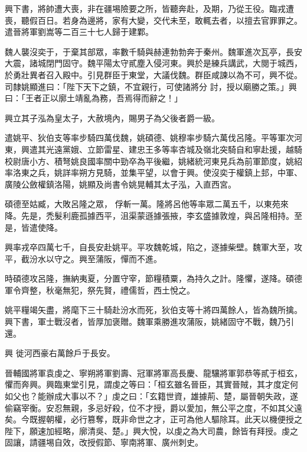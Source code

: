 \begin{pinyinscope}
 興下書，將帥遭大喪，非在疆埸險要之所，皆聽奔赴，及期，乃從王役。臨戎遭喪，聽假百日。若身為邊將，家有大變，交代未至，敢輒去者，以擅去官罪罪之。遣晉將軍劉嵩等二百三十七人歸于建鄴。



 魏人襲沒奕于，于棄其部眾，率數千騎與赫連勃勃奔于秦州。魏軍進次瓦亭，長安大震，諸城閉門固守。魏平陽太守貳塵入侵河東。興於是練兵講武，大閱于城西，於勇壯異者召入殿中。引見群臣于東堂，大議伐魏。群臣咸諫以為不可，興不從。司隸姚顯進曰：「陛下天下之鎮，不宜親行，可使諸將分
 討，授以廟勝之策。」興曰：「王者正以廓土靖亂為務，吾焉得而辭之！」



 興立其子泓為皇太子，大赦境內，賜男子為父後者爵一級。



 遣姚平、狄伯支等率步騎四萬伐魏，姚碩德、姚穆率步騎六萬伐呂隆。平等軍次河東，興遣其光遠黨娥、立節雷星、建忠王多等率杏城及嶺北突騎自和寧赴援，越騎校尉唐小方、積弩姚良國率關中勁卒為平後繼，姚緒統河東見兵為前軍節度，姚紹率洛東之兵，姚詳率朔方見騎，並集平望，以會于興。使沒奕于權鎮上邽，中軍、廣陵公斂權鎮洛陽，姚顯及尚書令姚晃輔其太子泓，入直西宮。



 碩德至姑臧，大敗呂隆之眾，
 俘斬一萬。隆將呂他等率眾二萬五千，以東苑來降。先是，禿髮利鹿孤據西平，沮渠蒙遜據張掖，李玄盛據敦煌，與呂隆相持。至是，皆遣使降。



 興率戎卒四萬七千，自長安赴姚平。平攻魏乾城，陷之，逐據柴壁。魏軍大至，攻平，截汾水以守之。興至蒲阪，憚而不進。



 時碩德攻呂隆，撫納夷夏，分置守宰，節糧積粟，為持久之計。隆懼，遂降。碩德軍令齊整，秋毫無犯，祭先賢，禮儒哲，西土悅之。



 姚平糧竭矢盡，將麾下三十騎赴汾水而死，狄伯支等十將四萬餘人，皆為魏所擒。興下書，軍士戰沒者，皆厚加褒贈。魏軍乘勝進攻蒲阪，姚緒固守不戰，魏乃引還。



 興
 徙河西豪右萬餘戶于長安。



 晉輔國將軍袁虔之、寧朔將軍劉壽、冠軍將軍高長慶、龍驤將軍郭恭等貳于桓玄，懼而奔興。興臨東堂引見，謂虔之等曰：「桓玄雖名晉臣，其實晉賊，其才度定何如父也？能辦成大事以不？」虔之曰：「玄籍世資，雄據荊、楚，屬晉朝失政，遂偷竊宰衡。安忍無親，多忌好殺，位不才授，爵以愛加，無公平之度，不如其父遠矣。今既握朝權，必行篡奪，既非命世之才，正可為他人驅除耳。此天以機便授之陛下，願速加經略，廓清吳、楚。」興大悅，以虔之為大司農，餘皆有拜授。虔之固讓，請疆埸自效，改授假節、寧南將軍、廣州刺史。




\end{pinyinscope}
